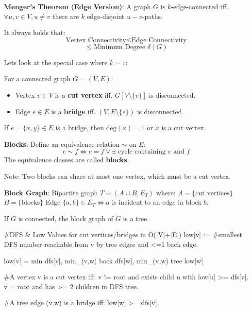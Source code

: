 \begin{theorem}
	\textbf{Menger's Theorem (Edge Version)}: A graph $G$ is $k$-edge-connected iff. $\forall u, v \in V, u \neq v$ there are $k$ edge-disjoint $u-v$-paths.
\end{theorem}

\begin{theorem}
	It always holds that:
	$$\text{Vertex Connectivity} \le \text{Edge Connectivity}$$
	$$\le \text{Minimum Degree } \delta(G)$$
\end{theorem}

Lets look at the special case where $k=1$:

\begin{definition}
	For a connected graph $G = (V, E)$:
	\begin{itemize}
		\item Vertex $v \in V$ is a \textbf{cut vertex} iff. $G[V \setminus \{v\}]$ is disconnected.
		\item Edge $e \in E$ is a \textbf{bridge} iff. $(V, E \setminus \{e\})$ is disconnected.
	\end{itemize}
\end{definition}

\begin{lemma}
	If $e = \{x, y\} \in E$ is a bridge, then $\text{deg}(x) = 1$ or $x$ is a cut vertex.
\end{lemma}

\begin{definition}
	\textbf{Blocks}: Define an equivalence relation $\sim$ on $E$:
	$$e \sim f \iff e=f \lor \exists \text{ cycle containing } e \text{ and } f$$
	The equivalence classes are called \textbf{blocks}.
\end{definition}

Note: Two blocks can share at most one vertex, which must be a cut vertex.

\begin{definition}
	\textbf{Block Graph}: Bipartite graph $T = (A \cup B, E_T)$ where:
	$A = \{\text{cut vertices}\}$
	$B = \{\text{blocks}\}$
	Edge $\{a, b\} \in E_T \iff a$ is incident to an edge in block $b$.
\end{definition}

\begin{theorem}
	If $G$ is connected, the block graph of $G$ is a tree.
\end{theorem}

\begin{algorithm}
	#DFS & Low Values for cut vertices/bridges in O(|V|+|E|)
	low[v] := #smallest DFS number reachable from v by tree edges and <=1 back edge.

	low[v] = min{ dfs[v], min_{(v,w) back} dfs[w], min_{(v,w) tree} low[w] }

	#A vertex v is a cut vertex iff:
	v != root and exists child u with low[u] >= dfs[v].
	v = root and has >= 2 children in DFS tree.

	#A tree edge (v,w) is a bridge iff:
	low[w] >= dfs[v].
\end{algorithm}
